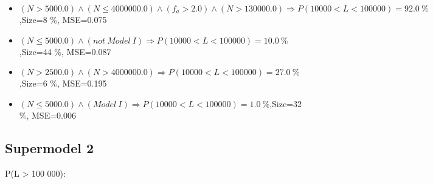 \documentclass[numbered]{CSL}
\begin{document}
\begin{itemize}
\item $(N > 5000.0) \land (N \leq 4000000.0) \land (f_a > 2.0) \land (N > 130000.0) \Rightarrow P(10 000 < L < 100 000) = 92.0~\%$,\hfill Size=8 \%, MSE=0.075
\item $(N \leq 5000.0) \land (not~Model~I) \Rightarrow P(10 000 < L < 100 000) = 10.0~\%$,\hfill Size=44 \%, MSE=0.087
\item $(N > 2500.0) \land (N > 4000000.0) \Rightarrow P(10 000 < L < 100 000) = 27.0~\%$,\hfill Size=6 \%, MSE=0.195
\item $(N \leq 5000.0) \land (Model~I) \Rightarrow P(10 000 < L < 100 000) = 1.0~\%$,\hfill Size=32 \%, MSE=0.006
\end{itemize}

\subsection{Supermodel 2}
P(L > 100 000):
\end{document}
